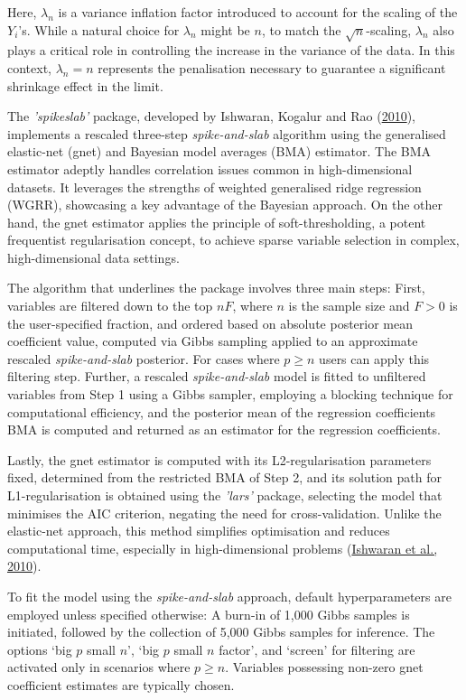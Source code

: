 \documentclass[
  11pt,
]{article}
\begin{document}
Here, \(\lambda_n\) is a variance inflation factor introduced to account
for the scaling of the \(Y_i\)'s. While a natural choice for
\(\lambda_n\) might be \(n\), to match the \(\sqrt{n}\)-scaling,
\(\lambda_n\) also plays a critical role in controlling the increase in
the variance of the data. In this context, \(\lambda_n = n\) represents
the penalisation necessary to guarantee a significant shrinkage effect
in the limit.

The \emph{'spikeslab'} package, developed by Ishwaran, Kogalur and Rao
(\protect\hyperlink{ref-Ishwaran2010}{2010}), implements a rescaled
three-step \emph{spike-and-slab} algorithm using the generalised
elastic-net (gnet) and Bayesian model averages (BMA) estimator. The BMA
estimator adeptly handles correlation issues common in high-dimensional
datasets. It leverages the strengths of weighted generalised ridge
regression (WGRR), showcasing a key advantage of the Bayesian approach.
On the other hand, the gnet estimator applies the principle of
soft-thresholding, a potent frequentist regularisation concept, to
achieve sparse variable selection in complex, high-dimensional data
settings.

The algorithm that underlines the package involves three main steps:
First, variables are filtered down to the top \(nF\), where \(n\) is the
sample size and \(F > 0\) is the user-specified fraction, and ordered
based on absolute posterior mean coefficient value, computed via Gibbs
sampling applied to an approximate rescaled \emph{spike-and-slab}
posterior. For cases where \(p \geq n\) users can apply this filtering
step. Further, a rescaled \emph{spike-and-slab} model is fitted to
unfiltered variables from Step 1 using a Gibbs sampler, employing a
blocking technique for computational efficiency, and the posterior mean
of the regression coefficients BMA is computed and returned as an
estimator for the regression coefficients.

Lastly, the gnet estimator is computed with its L2-regularisation
parameters fixed, determined from the restricted BMA of Step 2, and its
solution path for L1-regularisation is obtained using the \emph{'lars'}
package, selecting the model that minimises the AIC criterion, negating
the need for cross-validation. Unlike the elastic-net approach, this
method simplifies optimisation and reduces computational time,
especially in high-dimensional problems
(\protect\hyperlink{ref-Ishwaran2010}{Ishwaran et al., 2010}).

To fit the model using the \emph{spike-and-slab} approach, default
hyperparameters are employed unless specified otherwise: A burn-in of
1,000 Gibbs samples is initiated, followed by the collection of 5,000
Gibbs samples for inference. The options `big \(p\) small \(n\)', `big
\(p\) small \(n\) factor', and `screen' for filtering are activated only
in scenarios where \(p \geq n\). Variables possessing non-zero gnet
coefficient estimates are typically chosen.
\end{document}
